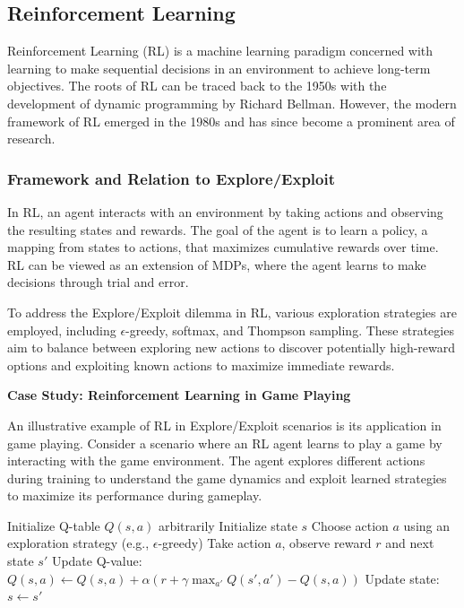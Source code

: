 \documentclass[12pt]{book} %
\begin{document}
\subsection{Reinforcement Learning}

Reinforcement Learning (RL) is a machine learning paradigm concerned with learning to make sequential decisions in an environment to achieve long-term objectives. The roots of RL can be traced back to the 1950s with the development of dynamic programming by Richard Bellman. However, the modern framework of RL emerged in the 1980s and has since become a prominent area of research.

\subsubsection{Framework and Relation to Explore/Exploit}

In RL, an agent interacts with an environment by taking actions and observing the resulting states and rewards. The goal of the agent is to learn a policy, a mapping from states to actions, that maximizes cumulative rewards over time. RL can be viewed as an extension of MDPs, where the agent learns to make decisions through trial and error.

To address the Explore/Exploit dilemma in RL, various exploration strategies are employed, including $\epsilon$-greedy, softmax, and Thompson sampling. These strategies aim to balance between exploring new actions to discover potentially high-reward options and exploiting known actions to maximize immediate rewards.

\textbf{Case Study: Reinforcement Learning in Game Playing}

An illustrative example of RL in Explore/Exploit scenarios is its application in game playing. Consider a scenario where an RL agent learns to play a game by interacting with the game environment. The agent explores different actions during training to understand the game dynamics and exploit learned strategies to maximize its performance during gameplay.
\FloatBarrier
\begin{algorithm}
\caption{Q-learning Algorithm for Reinforcement Learning}
\begin{algorithmic}[1]
\State Initialize Q-table $Q(s, a)$ arbitrarily
    \State Initialize state $s$
        \State Choose action $a$ using an exploration strategy (e.g., $\epsilon$-greedy)
        \State Take action $a$, observe reward $r$ and next state $s'$
        \State Update Q-value: $Q(s, a) \gets Q(s, a) + \alpha \left( r + \gamma \max_{a'} Q(s', a') - Q(s, a) \right)$
        \State Update state: $s \gets s'$
    \EndWhile
\EndFor
\end{algorithmic}
\end{algorithm}
\FloatBarrier
\end{document}
